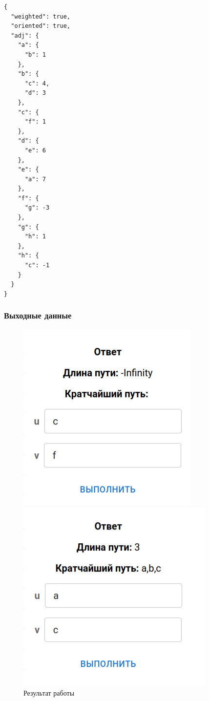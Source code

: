 \begin{verbatim}
{
  "weighted": true,
  "oriented": true,
  "adj": {
    "a": {
      "b": 1
    },
    "b": {
      "c": 4,
      "d": 3
    },
    "c": {
      "f": 1
    },
    "d": {
      "e": 6
    },
    "e": {
      "a": 7
    },
    "f": {
      "g": -3
    },
    "g": {
      "h": 1
    },
    "h": {
      "c": -1
    }
  }
}
\end{verbatim}

\subsubsection{Выходные данные}
\begin{figure}[H]
  \begin{minipage}{0.5\textwidth}
    \centering\includegraphics[width=0.7\linewidth]{figs/task-10/res-10-1.png}
  \end{minipage}
  \begin{minipage}{0.5\textwidth}
    \centering\includegraphics[width=0.7\linewidth]{figs/task-10/res-10-2.png}
  \end{minipage}
  \caption{Результат работы}
\end{figure}